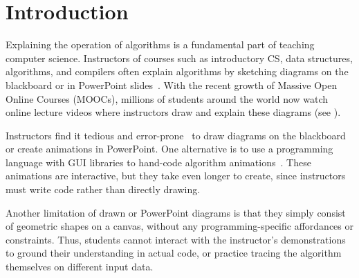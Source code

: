 \section{Introduction}

Explaining the operation of algorithms is a fundamental part of teaching
computer science. Instructors of courses such as introductory CS, data structures, algorithms,
and compilers often explain algorithms by sketching diagrams on the
blackboard or in PowerPoint slides~\cite{Orsega2012}. With the recent growth of
Massive Open Online Courses (MOOCs), millions of students around the world now
watch online lecture videos where instructors draw and explain these diagrams
(see ).

Instructors find it tedious and error-prone~\cite{Ross1991} to draw diagrams on
the blackboard or create animations in PowerPoint. One alternative is to use a
programming language with GUI libraries to hand-code algorithm
animations~\cite{Shaffer2011}. These animations are interactive, but they take
even longer to create, since instructors must write code rather than directly
drawing.

Another limitation of drawn or PowerPoint diagrams is that they simply consist
of geometric shapes on a canvas, without any programming-specific affordances or
constraints. Thus, students cannot interact with the instructor's demonstrations
to ground their understanding in actual code, or practice tracing the algorithm
themselves on different input data.

